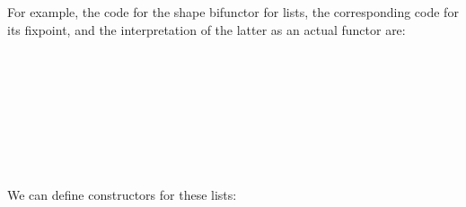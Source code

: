 \documentclass[fleqn,runningheads]{llncs}
\begin{document}
For example, the code  for the shape bifunctor for lists, the corresponding code  for its fixpoint, and the interpretation  of the latter as an actual functor are:
\begin{code}%
\>[0]%
\>[8]\AgdaSymbol{:}\AgdaSpace{}%
\<%
\\
\>[0]%
\>[8]\AgdaSymbol{=}\AgdaSpace{}%
\AgdaSpace{}%
\AgdaSpace{}%
\AgdaOperator{\AgdaInductiveConstructor{+}}\AgdaSpace{}%
\AgdaSymbol{(}\AgdaSpace{}%
\AgdaOperator{\AgdaInductiveConstructor{*}}\AgdaSpace{}%
\AgdaSymbol{)}\<%
\\
%
\\[\AgdaEmptyExtraSkip]%
\>[0]%
\>[8]\AgdaSymbol{:}\AgdaSpace{}%
\<%
\\
\>[0]%
\>[8]\AgdaSymbol{=}\AgdaSpace{}%
\AgdaSpace{}%
\<%
\\
%
\\[\AgdaEmptyExtraSkip]%
\>[0]%
\>[8]\AgdaSymbol{:}\AgdaSpace{}%
\AgdaSpace{}%
\AgdaSpace{}%
\<%
\\
\>[0]%
\>[8]\AgdaSymbol{=}\AgdaSpace{}%
\AgdaOperator{\AgdaFunction{[[}}\AgdaSpace{}%
\AgdaSpace{}%
\AgdaOperator{\AgdaFunction{]]F}}\<%
\end{code}
We can define constructors for these lists:
\begin{code}%
\>[0]\AgdaSpace{}%
\AgdaSymbol{:}\AgdaSpace{}%
\AgdaSpace{}%
\<%
\\
\>[0]\AgdaSpace{}%
\AgdaSymbol{=}\AgdaSpace{}%
\AgdaSpace{}%
\AgdaSymbol{(}\AgdaSpace{}%
\AgdaSymbol{)}\<%
\\
%
\\[\AgdaEmptyExtraSkip]%
\>[0]\AgdaSpace{}%
\AgdaSymbol{:}\AgdaSpace{}%
\AgdaSpace{}%
\AgdaSpace{}%
\AgdaSpace{}%
\AgdaSpace{}%
\AgdaSpace{}%
\AgdaSpace{}%
\<%
\\
\>[0]\AgdaSpace{}%
\AgdaSpace{}%
\AgdaSpace{}%
\AgdaSymbol{=}%
\>[17]\AgdaSpace{}%
\AgdaSymbol{(}\AgdaSpace{}%
\AgdaSpace{}%
\AgdaSymbol{(}\AgdaSpace{}%
\AgdaSymbol{(}\AgdaSpace{}%
\AgdaSpace{}%
\AgdaOperator{\AgdaInductiveConstructor{,}}%
\>[36]\AgdaSpace{}%
\AgdaSymbol{)))}\<%
\end{code}
\end{document}
